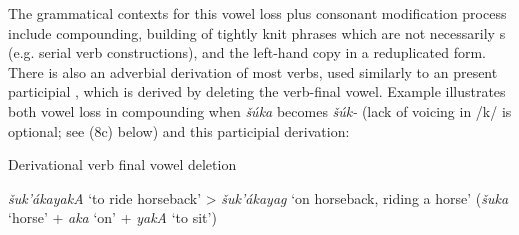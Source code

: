 \documentclass[output=paper]{LSP/langsci}
\begin{document}
The grammatical contexts for this vowel loss plus consonant modification process include compounding, building of tightly knit phrases which are not necessarily s (e.g. serial verb constructions), and the left-hand copy in a reduplicated form. There is also an adverbial derivation of most verbs, used similarly to an  present participial , which is derived by deleting the verb-final vowel. Example  illustrates both vowel loss in compounding when \textit{\v{s}úka} becomes \textit{\v{s}úk-} (lack of voicing in /k/ is optional; see (8c) below) and this participial derivation:

\begin{exe}
\ex \label{ex:rood:7}
Derivational verb final vowel deletion

\textit{\v{s}uk'ákayakA} `to ride horseback' > \textit{\v{s}uk'ákayag} `on horseback, riding a horse' (\textit{\v{s}uka} `horse' + \textit{aka} `on' + \textit{yakA} `to sit')
\end{exe}
\end{document}
